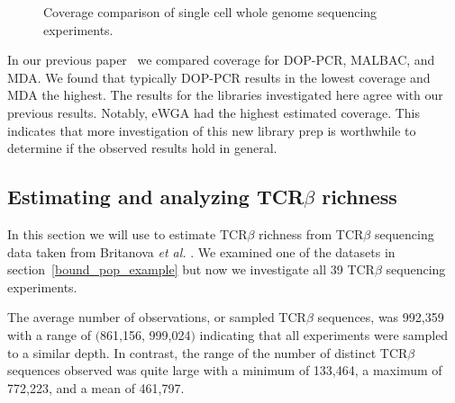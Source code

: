 \documentclass[11pt, titlepage]{article}
\begin{document}
\begin{figure}[h!]
\caption{Coverage comparison of single cell 
whole genome sequencing experiments.}
\end{figure}

In our previous paper~\cite{daley2014modeling}
we compared  coverage for DOP-PCR, MALBAC,
and MDA.  We found that typically DOP-PCR results in the
lowest coverage and MDA the highest.
The results for the libraries investigated here
agree with our previous results.  
Notably, eWGA had the highest estimated
coverage.  This indicates that more investigation of
this new library prep is worthwhile to determine if the
observed results hold in general.

\newpage 

\subsection*{Estimating and analyzing TCR$\beta$ richness}

In this section we will use 
to estimate TCR$\beta$ richness from TCR$\beta$
sequencing data taken from Britanova {\em et al.}
\cite{britanova2014age}.  We examined one
of the datasets in section~\ref{bound_pop_example}
but now we investigate all 39 TCR$\beta$ sequencing
experiments.

The average number of observations, or sampled
TCR$\beta$ sequences, was 992,359 with a
range of  $($861,156, 999,024$)$
indicating that all experiments were sampled to a similar
depth.  
In contrast, the range of the number of distinct TCR$\beta$
sequences observed was quite large with a minimum of
133,464, a maximum of 772,223, and a mean of 461,797.  
\end{document}
